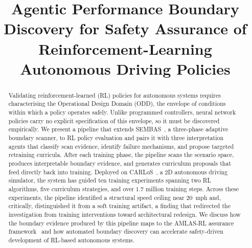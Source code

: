 \documentclass[conference]{IEEEtran}
\begin{document}
\title{Agentic Performance Boundary Discovery for Safety Assurance of
Reinforcement-Learning Autonomous Driving Policies}

\author{
\and
{}
}

\maketitle

\begin{abstract}
Validating reinforcement-learned (RL) policies for autonomous systems requires
characterising the Operational Design Domain (ODD), the envelope of conditions
within which a policy operates safely. Unlike programmed controllers, neural
network policies carry no explicit specification of this envelope, so it must be
discovered empirically. We present a pipeline that extends SEMBAS~\cite{b1}, a
three-phase adaptive boundary scanner, to RL policy evaluation and pairs it with
three interpretation agents that classify scan evidence, identify failure
mechanisms, and propose targeted retraining curricula. After each training phase,
the pipeline scans the scenario space, produces interpretable boundary evidence,
and generates curriculum proposals that feed directly back into training.
Deployed on CARLoS~\cite{b2}, a 2D autonomous driving simulator, the system has
guided ten training experiments spanning two RL algorithms, five curriculum
strategies, and over 1.7 million training steps. Across these experiments, the
pipeline identified a structural speed ceiling near 20~mph and, critically,
distinguished it from a soft training artifact, a finding that redirected the
investigation from training interventions toward architectural redesign. We
discuss how the boundary evidence produced by this pipeline maps to the AMLAS-RL
assurance framework~\cite{b3} and how automated boundary discovery can
accelerate safety-driven development of RL-based autonomous systems.
\end{abstract}
\end{document}
